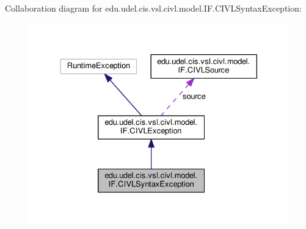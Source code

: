 Collaboration diagram for edu.\+udel.\+cis.\+vsl.\+civl.\+model.\+I\+F.\+C\+I\+V\+L\+Syntax\+Exception\+:
\nopagebreak
\begin{figure}[H]
\begin{center}
\leavevmode
\includegraphics[width=330pt]{classedu_1_1udel_1_1cis_1_1vsl_1_1civl_1_1model_1_1IF_1_1CIVLSyntaxException__coll__graph}
\end{center}
\end{figure}
